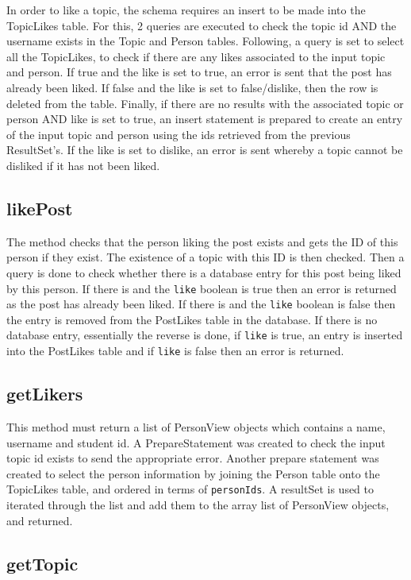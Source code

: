 \documentclass{article}
\begin{document}
In order to like a topic, the schema requires an insert to be made into the TopicLikes table. For this, 2 queries are executed to check the topic id AND the username exists in the Topic and Person tables. Following, a query is set to select all the TopicLikes, to check if there are any likes associated to the input topic and person. If true and the like is set to true, an error is sent that the post has already been liked. If false and the like is set to false/dislike, then the row is deleted from the table.
Finally, if there are no results with the associated topic or person AND like is set to true, an insert statement is prepared to create an entry of the input topic and person using the ids retrieved from the previous ResultSet’s. If the like is set to dislike, an error is sent whereby a topic cannot be disliked if it has not been liked.

\subsection*{likePost}

The method checks that the person liking the post exists and gets the ID of this person if they exist. The existence of a topic with this ID is then checked. Then a query is done to check whether there is a database entry for this post being liked by this person. If there is and the \texttt{like} boolean is true then an error is returned as the post has already been liked. If there is and the \texttt{like} boolean is false then the entry is removed from the PostLikes table in the database. If there is no database entry, essentially the reverse is done, if \texttt{like} is true, an entry is inserted into the PostLikes table and if \texttt{like} is false then an error is returned.

\subsection*{getLikers}

This method must return a list of PersonView objects which contains a name, username and student id. A PrepareStatement was created to check the input topic id exists to send the appropriate error. Another prepare statement was created to select the person information by joining the Person table onto the TopicLikes table, and ordered in terms of \texttt{personIds}. A resultSet is used to iterated through the list and add them to the array list of PersonView objects, and returned.

\subsection*{getTopic}
\end{document}
